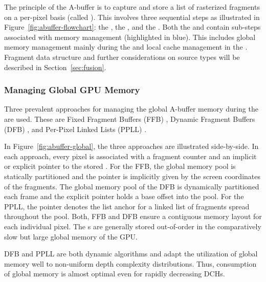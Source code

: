 \documentclass{egpubl}
\newcommand{\todo}[1]{{\color{red}\emph{(#1)}}}
\newcommand{\ab}{\mbox{A-buffer}}
\newcommand{\dch}{DCH}
\begin{document}

The principle of the \ab{} is to capture and store a list of rasterized fragments on a per-pixel basis (called \emph{\bFraglist}). 
This involves three sequential steps as illustrated in Figure~\ref{fig:abuffer-flowchart}: the \sClear, the \sFill, and the \sResolve. 
Both the \sFill{} and \sResolve{} contain sub-steps associated with memory management (highlighted in blue). 
This includes global memory management mainly during the \sFill{} and local cache management in the \sResolve.
Fragment data structure and further considerations on source types will be described in Section~\ref{sec:fusion}.





\subsubsection*{Managing Global GPU Memory}

Three prevalent approaches for managing the global \ab{} memory during the \sFill{} are used.
These are Fixed Fragment Buffers (FFB) \cite{Crassin2010}, Dynamic Fragment Buffers (DFB) \cite{Maule2012,Vasilakis2012}, and Per-Pixel Linked Lists (PPLL) \cite{kainz2009ray,Yang2010,Crassin2010}. 

In Figure~\ref{fig:abuffer-global}, the three approaches are illustrated side-by-side.  
In each approach, every pixel is associated with a fragment counter and an implicit or explicit pointer to the stored \bFraglist. 
For the FFB, the global memory pool is statically partitioned and the pointer is implicitly given by the screen coordinates of the fragments. 
The global memory pool of the DFB is dynamically partitioned each frame and the explicit pointer holds a base offset into the pool. 
For the PPLL, the pointer denotes the list anchor for a linked list of fragments spread throughout the pool. 
Both, FFB and DFB ensure a contiguous memory layout for each individual pixel. 
The \bFraglist s are generally stored out-of-order in the comparatively slow but large global memory of the GPU.

DFB and PPLL are both dynamic algorithms and adapt the utilization of global memory well to non-uniform depth complexity distributions. 
Thus, consumption of global memory is almost optimal even for rapidly decreasing \dch{}s. 
\end{document}
